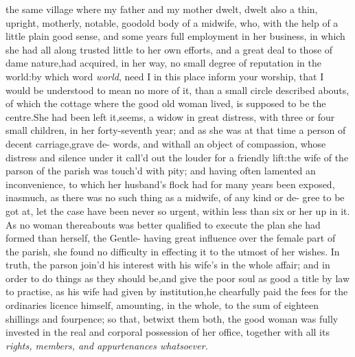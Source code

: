 \documentclass{article}
\begin{document}
 the same village where my father
and my mother dwelt, dwelt also a thin, upright, motherly, notable,
good\break old body of a midwife, who, with the help of a little plain
good sense, and some years full employment in her business, in
which she had all along trusted little to her own efforts, and a
great deal to those of dame nature,\tsk  had acquired, in her way,
no small degree of reputation in the world:\tsk  by which word
\textit{world}, need I in this place inform your worship,
that I would be understood to mean no 
more of it, than a small circle described 
abouts, of which the cottage where the good old woman lived, is supposed to be
the centre.\tsh  She had been left it\sic,\break seems, a widow in great distress, with three or
four small children, in her forty-seventh year; and as she was at that time a person
of decent carriage,\tsk  grave de-\break
{}
words, and
withall an object of compassion, whose distress and silence under it call’d out the
louder for a friendly lift:\break the wife of the parson of the parish was touch’d with
pity; and having often la\-mented an inconvenience, to which her husband’s flock had
for many years been exposed, inasmuch, as there was no such thing as a midwife, of
any kind or de- gree to be got at, let the case have been never so urgent, within
less than six or 
her up in it. As no woman thereabouts was better
qualified to execute the plan she had formed than
herself, the Gentle-
having great influence over the female part of the
parish, she found no difficulty in effecting it to
the utmost of her wishes. In truth, the parson
join’d his interest 
with his wife’s in the whole affair; and in order to
do things as they should be,\break and give the poor
soul as good a title by law to practise, as his wife
had given by institution,\tsk he chearfully paid the
fees for the ordinaries licence himself, amounting,
in the whole, to the sum of eighteen shillings and
fourpence; so that, betwixt them both, the good
woman was fully invested in the real and corporal
possession of her office, together with all its
\textit{rights, members, and appurtenances
whatsoever.}
\end{document}
